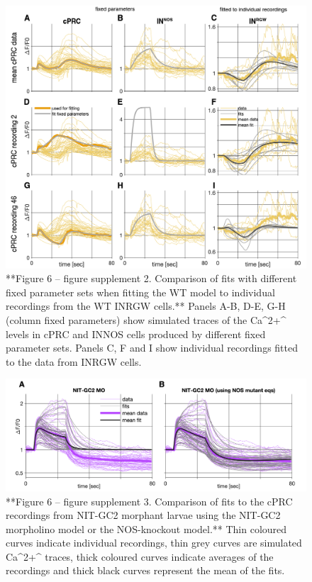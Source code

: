 \documentclass[
  10pt,
  onecolumn]{article}
\begin{document}
\begin{figure}
\includegraphics[width=26.25in]{figures/Figure6_fig_Suppl2} \caption{**Figure 6 -- figure supplement 2. Comparison of fits with different fixed parameter sets when fitting the WT model to individual recordings from the WT INRGW cells.** Panels A-B, D-E, G-H  (column fixed parameters) show simulated traces of the Ca^2+^ levels in cPRC and INNOS cells produced by different fixed parameter sets. Panels C, F and I show individual recordings fitted to the data from INRGW cells.}\label{fig:unnamed-chunk-21}
\end{figure}

\begin{figure}
\includegraphics[width=26.25in]{figures/Figure6_fig_Suppl3} \caption{**Figure 6 -- figure supplement 3. Comparison of fits to the cPRC recordings from NIT-GC2 morphant larvae using the NIT-GC2 morpholino model or the NOS-knockout model.**  Thin coloured curves indicate individual recordings, thin grey curves are simulated Ca^2+^ traces, thick coloured curves indicate averages of the recordings and thick black curves represent the mean of the fits.}\label{fig:unnamed-chunk-22}
\end{figure}
\end{document}
